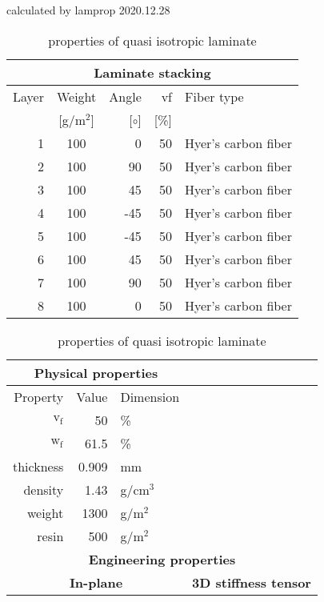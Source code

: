 \begin{table}[!htbp]
  \renewcommand{\arraystretch}{1.2}
  \caption{\label{tab:quasi isotropic laminate}properties of quasi isotropic laminate}
  \centering\footnotesize{\rule{0pt}{10pt}
  \tiny calculated by lamprop 2020.12.28\\[3pt]}
    \begin{tabular}[t]{rcrrl}
      \multicolumn{5}{c}{\small\textbf{Laminate stacking}}\\[0.1em]
      \toprule %
      Layer & Weight & Angle & vf & Fiber type\\
            & [g/m$^2$] & [$\circ$] & [\%]\\
      \midrule
      1 &  100 &     0 & 50 & Hyer's carbon fiber\\
      2 &  100 &    90 & 50 & Hyer's carbon fiber\\
      3 &  100 &    45 & 50 & Hyer's carbon fiber\\
      4 &  100 &   -45 & 50 & Hyer's carbon fiber\\
      5 &  100 &   -45 & 50 & Hyer's carbon fiber\\
      6 &  100 &    45 & 50 & Hyer's carbon fiber\\
      7 &  100 &    90 & 50 & Hyer's carbon fiber\\
      8 &  100 &     0 & 50 & Hyer's carbon fiber\\
      \bottomrule
    \end{tabular}\hspace{0.02\textwidth}
    \begin{tabular}[t]{rrlrrl}
      \multicolumn{3}{c}{\small\textbf{Physical properties}}\\[0.1em]
      \toprule
      Property & Value & Dimension\\
      \midrule
      $\mathrm{v_f}$ & 50 &\%\\
      $\mathrm{w_f}$ & 61.5 &\%\\
      thickness & 0.909 & mm\\
      density & 1.43 & g/cm$^3$\\
      weight & 1300 & g/m$^2$\\
      resin & 500 & g/m$^2$\\
      \midrule
      \multicolumn{6}{c}{\small\textbf{Engineering properties}}\\[0.1em]
      \multicolumn{3}{c}{\small\textbf{In-plane}} & 
\multicolumn{3}{c}{\small\textbf{3D stiffness tensor}}\\[0.1em]

\end{tabular}
\end{table}

